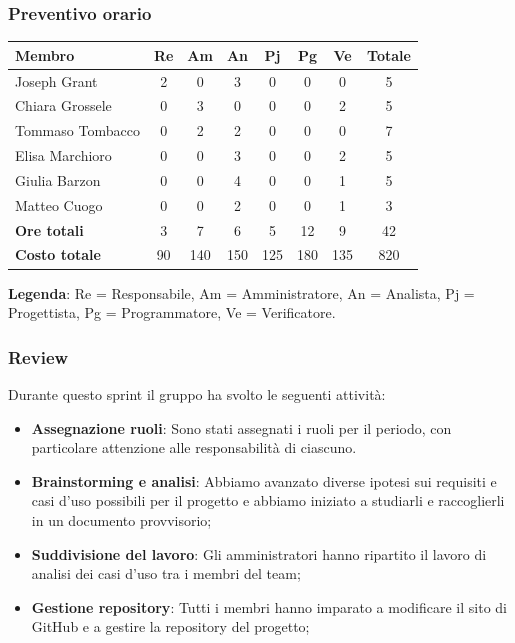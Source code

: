 \documentclass[11pt,a4paper]{article}
\begin{document}
\subsubsection{Preventivo orario}
\begin{center}
    \begin{tabular}{|l|c|c|c|c|c|c|c|}
        \hline
        \textbf{Membro} & \textbf{Re} & \textbf{Am} & \textbf{An} & \textbf{Pj} & \textbf{Pg} & \textbf{Ve} & \textbf{Totale} \\
        \hline
        Joseph Grant & 2 & 0 & 3 & 0 & 0 & 0 & 5 \\
        \hline
        Chiara Grossele & 0 & 3 & 0 & 0 & 0 & 2 & 5 \\
        \hline
        Tommaso Tombacco & 0 & 2 & 2 & 0 & 0 & 0 & 7 \\
        \hline
        Elisa Marchioro & 0 & 0 & 3 & 0 & 0 & 2 & 5 \\
        \hline
        Giulia Barzon & 0 & 0 & 4 & 0 & 0 & 1 & 5 \\
        \hline
        Matteo Cuogo & 0 & 0 & 2 & 0 & 0 & 1 & 3 \\
        \hline
        \textbf{Ore totali} & 3 & 7 & 6 & 5 & 12 & 9 & 42 \\
        \hline
        \textbf{Costo totale} & 90 & 140 & 150 & 125 & 180 & 135 & 820 \\
        \hline
    \end{tabular}
\end{center}

\noindent \textbf{Legenda}: Re = Responsabile, Am = Amministratore, An = Analista, Pj = Progettista, Pg = Programmatore, Ve = Verificatore.

\subsubsection{Review}
Durante questo sprint il gruppo ha svolto le seguenti attività:
\begin{itemize}
    \item \textbf{Assegnazione ruoli}: Sono stati assegnati i ruoli per il periodo, con particolare attenzione alle responsabilità di ciascuno.
    \item \textbf{Brainstorming e analisi}: Abbiamo avanzato diverse ipotesi sui requisiti e casi d'uso possibili per il progetto e abbiamo iniziato a studiarli e raccoglierli in un documento provvisorio;
    \item \textbf{Suddivisione del lavoro}: Gli amministratori hanno ripartito il lavoro di analisi dei casi d'uso tra i membri del team;
    \item \textbf{Gestione repository}: Tutti i membri hanno imparato a modificare il sito di GitHub e a gestire la repository del progetto;
\end{itemize}
\end{document}
